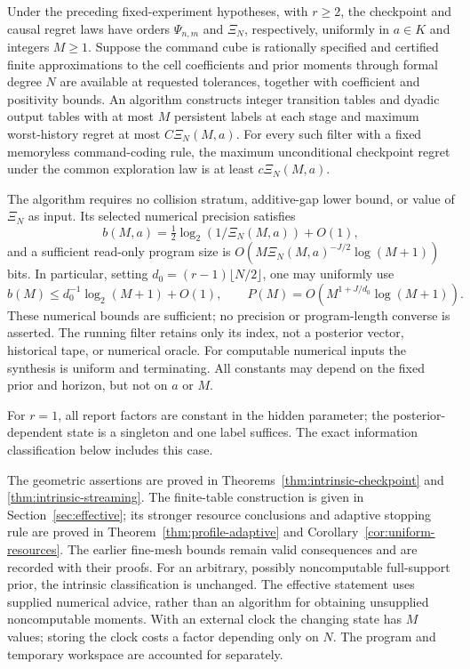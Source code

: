 \begin{theorem}
\label{thm:effective-main}
Under the preceding fixed-experiment hypotheses, with $r\ge2$, the
checkpoint and causal regret laws have orders $\Psi_{n,m}$ and $\Xi_N$,
respectively, uniformly in $a\in K$ and integers $M\ge1$.
Suppose the command cube is rationally specified and certified finite
approximations to the cell coefficients and prior moments through formal
degree $N$ are available at requested tolerances, together with coefficient and
positivity bounds.
An algorithm constructs integer transition tables and dyadic output
tables with at most $M$ persistent labels at each stage and maximum
worst-history regret at most $C\Xi_N(M,a)$. For every such filter with
a fixed memoryless command-coding rule, the maximum unconditional
checkpoint regret under the common exploration law is at least
$c\Xi_N(M,a)$.

The algorithm requires no collision stratum, additive-gap lower bound,
or value of $\Xi_N$ as input. Its selected numerical precision satisfies
\[
 b(M,a)=\tfrac12\log_2(1/\Xi_N(M,a))+O(1),
\]
and a sufficient read-only program size is
$O(M\Xi_N(M,a)^{-J/2}\log(M+1))$ bits. In particular, setting
$d_0=(r-1)\lfloor N/2\rfloor$, one may uniformly use
\[
 b(M)\le d_0^{-1}\log_2(M+1)+O(1),\qquad
 P(M)=O(M^{1+J/d_0}\log(M+1)).
\]
These numerical bounds are sufficient; no precision or program-length
converse is asserted. The running filter retains only its index, not a
posterior vector, historical tape, or numerical oracle. For computable
numerical inputs the synthesis is uniform and terminating. All constants
may depend on the fixed prior and horizon, but not on $a$ or $M$.
\end{theorem}

For $r=1$, all report factors are constant in the hidden parameter; the
posterior-dependent state is a singleton and one label suffices. The
exact information classification below includes this case.

The geometric assertions are proved in
Theorems~\ref{thm:intrinsic-checkpoint} and
\ref{thm:intrinsic-streaming}. The finite-table construction is given
in Section~\ref{sec:effective}; its stronger resource conclusions and
adaptive stopping rule are proved in
Theorem~\ref{thm:profile-adaptive} and
Corollary~\ref{cor:uniform-resources}. The earlier fine-mesh bounds
remain valid consequences and are recorded with their proofs. For an
arbitrary, possibly noncomputable full-support prior, the intrinsic
classification is unchanged. The effective statement uses supplied
numerical advice, rather than an algorithm for obtaining unsupplied
noncomputable moments. With an external clock the changing state has
$M$ values; storing the clock costs a factor depending only on $N$.
The program and temporary workspace are accounted for separately.

